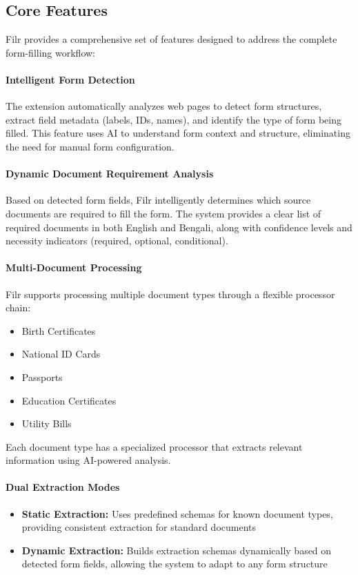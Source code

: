 \documentclass[11pt, a4paper]{article}
\theoremstyle{plain}
\theoremstyle{definition}
\begin{document}
\subsection{Core Features}

Filr provides a comprehensive set of features designed to address the complete form-filling workflow:

\paragraph{Intelligent Form Detection}
The extension automatically analyzes web pages to detect form structures, extract field metadata (labels, IDs, names), and identify the type of form being filled. This feature uses AI to understand form context and structure, eliminating the need for manual form configuration.

\paragraph{Dynamic Document Requirement Analysis}
Based on detected form fields, Filr intelligently determines which source documents are required to fill the form. The system provides a clear list of required documents in both English and Bengali, along with confidence levels and necessity indicators (required, optional, conditional).

\paragraph{Multi-Document Processing}
Filr supports processing multiple document types through a flexible processor chain:
\begin{itemize}
    \item Birth Certificates
    \item National ID Cards
    \item Passports
    \item Education Certificates
    \item Utility Bills
\end{itemize}

Each document type has a specialized processor that extracts relevant information using AI-powered analysis.

\paragraph{Dual Extraction Modes}
\begin{itemize}
    \item \textbf{Static Extraction:} Uses predefined schemas for known document types, providing consistent extraction for standard documents
    \item \textbf{Dynamic Extraction:} Builds extraction schemas dynamically based on detected form fields, allowing the system to adapt to any form structure
\end{itemize}
\end{document}
